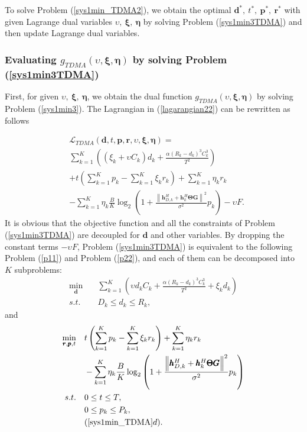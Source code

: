 \documentclass[journal]{IEEEtran}
\begin{document}
To solve Problem (\ref{sys1min_TDMA2}), we obtain the optimal $\pmb d^*,~ t^*,~ \pmb p^*,~ \pmb r^*$ with given Lagrange dual variables $\upsilon,~\pmb \xi,~\pmb \eta$ by solving Problem (\ref{sys1min3TDMA}) and then update Lagrange dual variables.


\subsubsection{Evaluating $g_{TDMA}(\upsilon,\pmb \xi,\pmb \eta)$ by solving Problem (\ref{sys1min3TDMA})}
First, for given $\upsilon,~\pmb \xi,~\pmb \eta$, we obtain the dual function $g_{TDMA}(\upsilon,\pmb \xi,\pmb \eta)$ by solving Problem (\ref{sys1min3}). The Lagrangian in (\ref{lagarangian22}) can be rewritten as follows

{\begin{align}\label{lagarangian222}
&\mathcal L_{TDMA}(\pmb d,t,\pmb p,\pmb r,\upsilon,\pmb \xi,\pmb \eta)=\\ \nonumber
&\sum_{k=1}^K\left( \left(\xi_k+\upsilon C_k \right)d_{k}+\frac{\alpha(R_{k}-d_{k})^3 C^3_{k}}{T^2}\right)\\ \nonumber
&+t\left(\sum_{k=1}^K p_k-\sum_{k=1}^K\xi_kr_k\right)
+\sum_{k=1}^K\eta_kr_k\\ \nonumber
&-\sum_{k=1}^K\eta_k\frac{B}{K}\log_2\left( 1+ \frac{ \left\|\pmb h_{D,k}^H+\pmb h_{k}^H \pmb \Theta \pmb G\right\|^2}{\sigma^2}  {p_k} \right)
-\upsilon F.
\end{align}}
It is obvious that the objective function and all the constraints of Problem (\ref{sys1min3TDMA}) are decoupled for $\pmb d$ and other variables. By dropping the constant terms $-\upsilon F$, Problem (\ref{sys1min3TDMA}) is equivalent to the following Problem (\ref{p11}) and Problem (\ref{p22}), and each of them can be decomposed into $K$ subproblems:
\begin{subequations}\label{p11}
	\begin{align}
	\mathop{\min}_{\pmb d} \quad &\sum_{k=1}^K \left(\upsilon d_kC_k+\frac{\alpha \left(R_{k}-d_{k}\right)^3C^3_k}{T^2}+\xi_kd_k\right)\\
	s.t. \quad  & D_k \leq d_k \leq R_k,
	\end{align}
\end{subequations}
and
{\begin{subequations}\label{p22}
	\begin{align}
	\mathop{\min}_{\pmb r,\pmb p, t}\quad  &t\left(\sum_{k=1}^K p_k-\sum_{k=1}^K\xi_kr_k\right)+\sum_{k=1}^K\eta_kr_k\\ \nonumber
	&-\sum_{k=1}^K\eta_k\frac{B}{K}\log_2\left( 1+ \frac{ \left\|\pmb h_{D,k}^H +\pmb h_{k}^H \pmb \Theta \pmb G\right\|^2}{\sigma^2}  {p_k} \right)\\
	s.t. \quad
	& 0 \leq t \leq T,\\
	& 0 \leq p_k \leq P_k,\\
	& (\ref{sys1min_TDMA}d).
	\end{align}
\end{subequations}}
\end{document}
